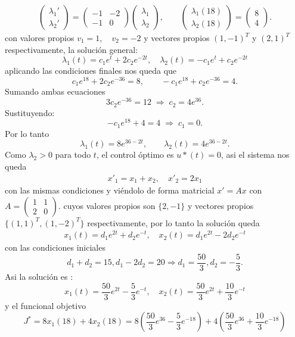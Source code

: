 \documentclass{uofa-eng-assignment}
\newcommand{\la}{\lambda}
\begin{document}
    \begin{align*}
    \begin{pmatrix}
        \lambda_1' \\
        \lambda_2'
        \end{pmatrix}
        =
        \begin{pmatrix}
        -1 & -2 \\
        -1 & 0
        \end{pmatrix}
        \begin{pmatrix}
        \lambda_1 \\
        \lambda_2
        \end{pmatrix},
        \qquad
        \begin{pmatrix}
        \lambda_1(18) \\
        \lambda_2(18)
        \end{pmatrix}
        =
        \begin{pmatrix}
        8 \\
        4
        \end{pmatrix}.
    \end{align*}
    con valores propios $v_1 = 1, \quad v_2=-2$ y vectores propios $(1,-1)^T$ y $(2,1)^T$ respectivamente, la solución general:
    \[
    \la_1(t) = c_1 e^t+2c_2e^{-2t}, \quad \la_2 (t)= -c_1e^t+c_2e^{-2t}
    \] 
    aplicando las condiciones finales nos queda que 
    \[
    c_1 e^{18} + 2c_2 e^{-36} = 8,
    \qquad
    -c_1 e^{18} + c_2 e^{-36} = 4.
    \]
    Sumando ambas ecuaciones
    \[
    3c_2 e^{-36} = 12
    \;\Rightarrow\;
    c_2 = 4e^{36}.
    \]
    Sustituyendo: 
    \[
    -c_1 e^{18} + 4 = 4
    \;\Rightarrow\;
    c_1 = 0.
    \]
    Por lo tanto
    \[
    \lambda_1(t) = 8e^{36-2t},
    \qquad
    \lambda_2(t) = 4e^{36-2t}.
    \]
    Como $\la_2 >0$ para todo $t$, el control óptimo es $u*(t) = 0$, asi el sistema nos queda 
    \begin{align*}
        x'_1 = x_1+x_2, \quad x'_2 = 2x_1
    \end{align*}
    con las mismas condiciones y viéndolo de forma matricial  $x'=Ax$ con $A = \begin{pmatrix}
        1 & 1 \\
        2 & 0 
    \end{pmatrix}.
    $
    cuyos valores propios son $\{2,-1\}$ y vectores propios $\{(1,1)^T , (1,-2)^T\}$ respectivamente, por lo tanto la solución queda 
    \begin{align*}
        x_1(t) = d_1 e^{2t}+d_2 e^{-t}, \quad x_2(t) = d_1 e ^{2t} -2d_2 e^{-t} 
    \end{align*}
    con las condiciones iniciales 
    \[
    d_1+d_2= 15, d_1 -2d_2= 20 \Rightarrow d_1 = \frac{50}{3}, d_2= -\frac{5}{3}.
    \]
    Asi la solución es :
    \[
    x_1(t) = \frac{50}{3} e^{2t} -\frac{5}{3}e^{-t}, \quad x_2(t) = \frac{50}{3} e ^{2t} +\frac{10}{3} e^{-t} 
    \]
    y el funcional objetivo
    \[
    J^*
    =
    8x_1(18) + 4x_2(18)
    =
    8\left(
    \frac{50}{3}e^{36}
    -
    \frac{5}{3}e^{-18}
    \right)
    +
    4\left(
    \frac{50}{3}e^{36}
    +
    \frac{10}{3}e^{-18}
    \right)
    \]
\end{document}
